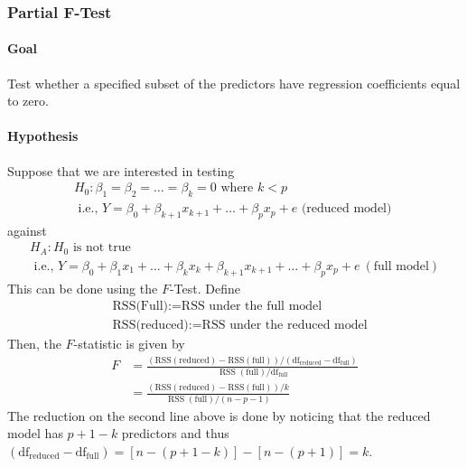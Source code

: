 \documentclass[11pt]{article}
\begin{document}
\subsubsection{Partial F-Test}
\paragraph{Goal} Test whether a specified subset of the predictors have regression coefficients equal to zero.
\paragraph{Hypothesis}  Suppose that we are interested in testing 
\begin{equation*}
    \begin{array}{c}{H_{0}: \beta_{1}=\beta_{2}=\ldots=\beta_{k}=0 \text { where } k<p} \\ {\text { i.e., } Y=\beta_{0}+\beta_{k+1} x_{k+1}+\ldots+\beta_{p} x_{p}+e \text { (reduced model) }}\end{array}
\end{equation*}
against
\begin{equation*}
    \begin{array}{c}{H_{A}: H_{0} \text { is not true }} \\ {\text { i.e., } Y=\beta_{0}+\beta_{1} x_{1}+\ldots+\beta_{k} x_{k}+\beta_{k+1} x_{k+1}+\ldots+\beta_{p} x_{p}+e ~(\text{full model})}\end{array}
\end{equation*}
This can be done using the $F$-Test. Define
\begin{align*}
    &\text{RSS(Full)} := \text{RSS under the full model} \\
    &\text{RSS(reduced)} := \text{RSS under the reduced model}
\end{align*}
Then, the $F$-statistic is given by
\begin{align*}
    F &= \frac{(\mathrm{RSS}(\mathrm{reduced})-\mathrm{RSS}(\mathrm{full})) /\left(\mathrm{df}_{\mathrm{reduced}}-\mathrm{df}_{\mathrm{full}}\right)}{\operatorname{RSS}(\mathrm{full}) / \mathrm{df}_{\mathrm{full}}} \\
    &= \frac{(\mathrm{RSS}(\mathrm{reduced})-\mathrm{RSS}(\mathrm{full})) / k}{\operatorname{RSS}(\mathrm{full}) /(n-p-1)}
\end{align*}
The reduction on the second line above is done by noticing that the reduced model has $p + 1 - k$ predictors and thus $\left(\mathrm{df}_{\mathrm{reduced}}-\mathrm{df}_{\mathrm{full}}\right) = [n-(p+1-k)]-[n-(p+1)]=k$.
\end{document}
